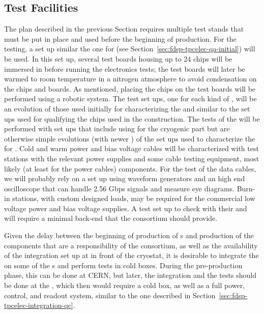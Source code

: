 \subsection{Test Facilities}
\label{sec:fdsp-tpcelec-production-facilities}

The  plan described in the previous Section requires
multiple test stands that must be put in place and used 
before the beginning of production. For the 
testing, a set up similar the one for  (see
Section~\ref{sec:fdsp-tpcelec-qa-initial}) will
be used. In this set up, several test boards housing up to 24
chips will be immersed in \lntwo before running the
electronics tests; the test boards will later be warmed to room temperature in 
a nitrogen atmosphere to avoid condensation on the chips and
boards. As mentioned, placing the chips on the test 
boards will be performed using a robotic system. The test set ups,
one for each kind of , will be an evolution of those
used initially for characterizing the  and similar
to the set ups used for qualifying the chips used in the 
construction. The tests of the  will be performed with
set ups that include using  for the cryogenic part
but are otherwise simple evolutions (with newer )
of the set ups used to characterize the 
for . Cold and warm power and bias voltage cables will
be characterized with test stations with the relevant 
power supplies and some cable testing equipment, most likely (at least for the power cables)  components.
For the test of the data cables, we will probably rely on a set up
using waveform generators and an high end oscilloscope that 
can handle 2.56 Gbps signals and measure eye diagrams. 
Burn-in stations, with custom designed loads, may be required for 
the commercial low voltage power and bias voltage supplies.
A test set up to check  with their 
and  will require a minimal  back-end that the
 consortium should provide.

Given the delay between the beginning of production of 
s and production of the components that are a responsibility of
the  consortium, as well as the availability of the
integration set up at  in front of the cryostat, it is
desirable to  integrate the 
on some of the s and perform tests in cold
boxes. During the pre-production phase, this can be done at CERN,
but later, the integration and the
tests should be done at the , which then would require a cold box,
as well as a full power, control, and readout system, similar
to the one described in Section~\ref{sec:fdsp-tpcelec-integration-qc}.
